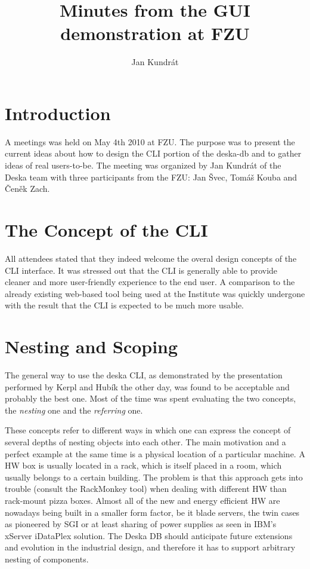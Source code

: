\documentclass[12pt]{article}
\author{Jan Kundrát}
\title{Minutes from the GUI demonstration at FZU}
\begin{document}
\maketitle

\section{Introduction}

A meetings was held on May 4th 2010 at FZU.  The purpose was to present the
current ideas about how to design the CLI portion of the deska-db and to gather
ideas of real users-to-be.  The meeting was organized by Jan Kundrát of the
Deska team with three participants from the FZU: Jan Švec, Tomáš Kouba and Čeněk
Zach.

\section{The Concept of the CLI}

All attendees stated that they indeed welcome the overal design concepts of the
CLI interface.  It was stressed out that the CLI is generally able to provide
cleaner and more user-friendly experience to the end user.  A comparison to the
already existing web-based tool being used at the Institute was quickly
undergone with the result that the CLI is expected to be much more usable.

\section{Nesting and Scoping}

The general way to use the deska CLI, as demonstrated by the presentation
performed by Kerpl and Hubík the other day, was found to be acceptable and
probably the best one.  Most of the time was spent evaluating the two concepts,
the {\em nesting} one and the {\em referring} one.

These concepts refer to different ways in which one can express the concept of
several depths of nesting objects into each other.  The main motivation and a
perfect example at the same time is a physical location of a particular machine.
A HW box is usually located in a rack, which is itself placed in a room, which
usually belongs to a certain building.  The problem is that this approach gets
into trouble (consult the RackMonkey tool) when dealing with different HW than
rack-mount pizza boxes.  Almost all of the new and energy efficient HW are
nowadays being built in a smaller form factor, be it blade servers, the twin
cases as pioneered by SGI or at least sharing of power supplies as seen in IBM's
xServer iDataPlex solution.  The Deska DB should anticipate future extensions
and evolution in the industrial design, and therefore it has to support
arbitrary nesting of components.
\end{document}
